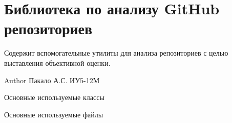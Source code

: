 \chapter{Библиотека по анализу Git\+Hub репозиториев}
\hypertarget{index}{}\label{index}
Содержит вспомогательные утилиты для анализа репозиториев с целью выставления объективной оценки. \begin{DoxyAuthor}{Author}
Пакало А.\+С. ИУ5-\/12М
\end{DoxyAuthor}
\begin{DoxyParagraph}{Основные используемые классы}

\begin{DoxyItemize}
\item {}
\item {}
\end{DoxyItemize}
\end{DoxyParagraph}
\begin{DoxyParagraph}{Основные используемые файлы}

\begin{DoxyItemize}
\item {}
\item {} 
\end{DoxyItemize}
\end{DoxyParagraph}
